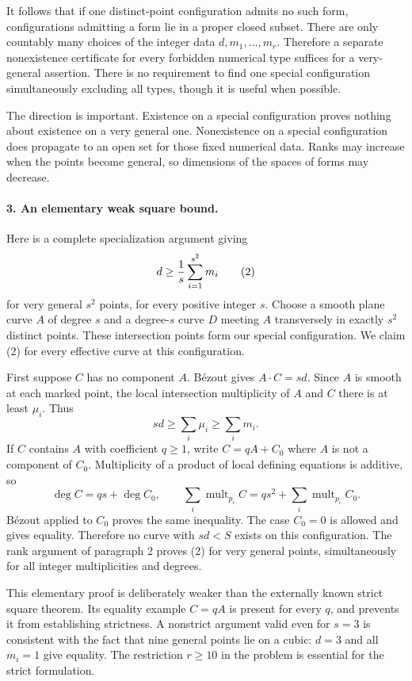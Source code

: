\documentclass[11pt]{article}
\begin{document}
It follows that if one distinct-point configuration admits no such form, configurations admitting a form lie in a proper closed subset. There are only countably many choices of the integer data $d,m_1,\ldots,m_r$. Therefore a separate nonexistence certificate for every forbidden numerical type suffices for a very-general assertion. There is no requirement to find one special configuration simultaneously excluding all types, though it is useful when possible.

The direction is important. Existence on a special configuration proves nothing about existence on a very general one. Nonexistence on a special configuration does propagate to an open set for those fixed numerical data. Ranks may increase when the points become general, so dimensions of the spaces of forms may decrease.

\paragraph{3. An elementary weak square bound.}
Here is a complete specialization argument giving
\[
 d\ge {1\over s}\sum_{i=1}^{s^2}m_i                     \tag{2}
\]
for very general $s^2$ points, for every positive integer $s$. Choose a smooth plane curve $A$ of degree $s$ and a degree-$s$ curve $D$ meeting $A$ transversely in exactly $s^2$ distinct points. These intersection points form our special configuration. We claim (2) for every effective curve at this configuration.

First suppose $C$ has no component $A$. B\'ezout gives $A\cdot C=sd$. Since $A$ is smooth at each marked point, the local intersection multiplicity of $A$ and $C$ there is at least $\mu_i$. Thus
\[
 sd\ge\sum_i\mu_i\ge\sum_i m_i.
\]
If $C$ contains $A$ with coefficient $q\ge1$, write $C=qA+C_0$ where $A$ is not a component of $C_0$. Multiplicity of a product of local defining equations is additive, so
\[
 \deg C=qs+\deg C_0,\qquad
 \sum_i\operatorname{mult}_{p_i}C=qs^2+
       \sum_i\operatorname{mult}_{p_i}C_0.
\]
B\'ezout applied to $C_0$ proves the same inequality. The case $C_0=0$ is allowed and gives equality. Therefore no curve with $sd<S$ exists on this configuration. The rank argument of paragraph 2 proves (2) for very general points, simultaneously for all integer multiplicities and degrees.

This elementary proof is deliberately weaker than the externally known strict square theorem. Its equality example $C=qA$ is present for every $q$, and prevents it from establishing strictness. A nonstrict argument valid even for $s=3$ is consistent with the fact that nine general points lie on a cubic: $d=3$ and all $m_i=1$ give equality. The restriction $r\ge10$ in the problem is essential for the strict formulation.
\end{document}
